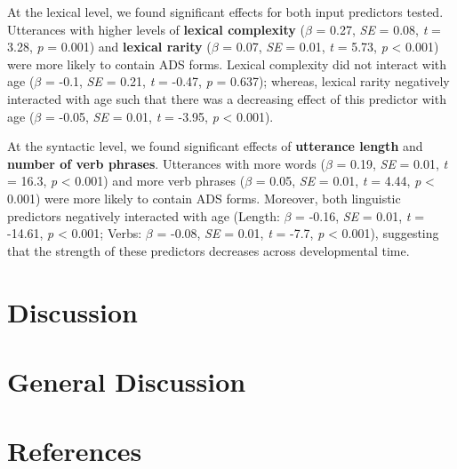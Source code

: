 \documentclass[10pt, letterpaper]{article}
\begin{document}
At the lexical level, we found significant effects for both input
predictors tested. Utterances with higher levels of \textbf{lexical
complexity} (\(\beta\) = 0.27, \emph{SE} = 0.08, \emph{t} = 3.28,
\emph{p} = 0.001) and \textbf{lexical rarity} (\(\beta\) = 0.07,
\emph{SE} = 0.01, \emph{t} = 5.73, \emph{p} \textless{} 0.001) were more
likely to contain ADS forms. Lexical complexity did not interact with
age (\(\beta\) = -0.1, \emph{SE} = 0.21, \emph{t} = -0.47, \emph{p} =
0.637); whereas, lexical rarity negatively interacted with age such that
there was a decreasing effect of this predictor with age (\(\beta\) =
-0.05, \emph{SE} = 0.01, \emph{t} = -3.95, \emph{p} \textless{} 0.001).

At the syntactic level, we found significant effects of
\textbf{utterance length} and \textbf{number of verb phrases}.
Utterances with more words (\(\beta\) = 0.19, \emph{SE} = 0.01, \emph{t}
= 16.3, \emph{p} \textless{} 0.001) and more verb phrases (\(\beta\) =
0.05, \emph{SE} = 0.01, \emph{t} = 4.44, \emph{p} \textless{} 0.001)
were more likely to contain ADS forms. Moreover, both linguistic
predictors negatively interacted with age (Length: \(\beta\) = -0.16,
\emph{SE} = 0.01, \emph{t} = -14.61, \emph{p} \textless{} 0.001; Verbs:
\(\beta\) = -0.08, \emph{SE} = 0.01, \emph{t} = -7.7, \emph{p}
\textless{} 0.001), suggesting that the strength of these predictors
decreases across developmental time.

\hypertarget{discussion}{%
\section{Discussion}\label{discussion}}

\hypertarget{general-discussion}{%
\section{General Discussion}\label{general-discussion}}

\hypertarget{references}{%
\section{References}\label{references}}

\setlength{\parindent}{-0.1in} 
\setlength{\leftskip}{0.125in}

\noindent
\end{document}
